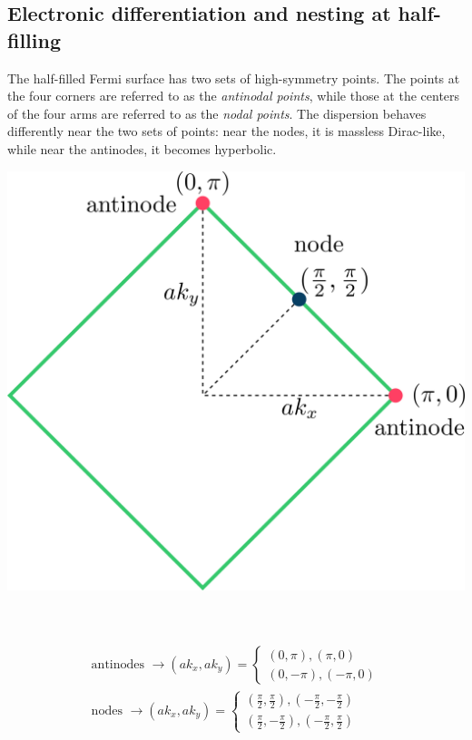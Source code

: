\documentclass[12pt]{article}
\numberwithin{equation}{section}
\begin{document}
\subsection*{Electronic differentiation and nesting at half-filling}
\begin{minipage}{0.5\textwidth}
	The half-filled Fermi surface has two sets of high-symmetry points. The points at the four corners are referred to as the \textit{antinodal points}, while those at the centers of the four arms are referred to as the \textit{nodal points}. The dispersion behaves differently near the two sets of points: near the nodes, it is massless Dirac-like, while near the antinodes, it becomes hyperbolic.
\end{minipage}
\hspace*{\fill}
\begin{minipage}{0.4\textwidth}
	\centering
	\includegraphics[width=\textwidth]{./Fsurf.png}
\end{minipage}
\\\\
\begin{equation*}\begin{aligned}
	\text{antinodes } \to \left(ak_x, ak_y\right) = \begin{cases}
\left(0, \pi \right), \left(\pi, 0 \right)\\
\left(0, -\pi \right), \left(-\pi, 0\right)
	\end{cases}\\
		\text{nodes } \to \left(ak_x, ak_y\right) = \begin{cases}
		\left(\frac{\pi}{2}, \frac{\pi}{2} \right), \left(-\frac{\pi}{2}, -\frac{\pi}{2}\right)\\
		\left(\frac{\pi}{2}, -\frac{\pi}{2} \right), \left(-\frac{\pi}{2}, \frac{\pi}{2}\right)
	\end{cases}
\end{aligned}\end{equation*}
\end{document}
